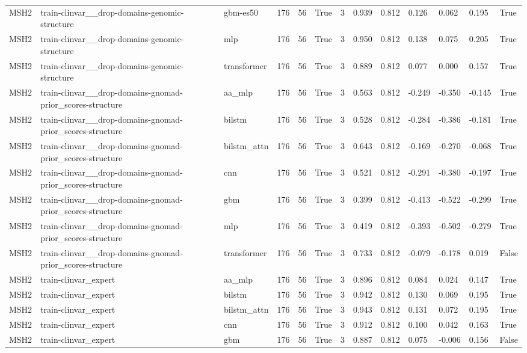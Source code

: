 \begin{table}[t]
\begin{tabular}{lllllllllllll}
MSH2 & train-clinvar\_\_drop-domains-genomic-structure & gbm-es50 & 176 & 56 & True & 3 & 0.939 & 0.812 & 0.126 & 0.062 & 0.195 & True \\
MSH2 & train-clinvar\_\_drop-domains-genomic-structure & mlp & 176 & 56 & True & 3 & 0.950 & 0.812 & 0.138 & 0.075 & 0.205 & True \\
MSH2 & train-clinvar\_\_drop-domains-genomic-structure & transformer & 176 & 56 & True & 3 & 0.889 & 0.812 & 0.077 & 0.000 & 0.157 & True \\
MSH2 & train-clinvar\_\_drop-domains-gnomad-prior\_scores-structure & aa\_mlp & 176 & 56 & True & 3 & 0.563 & 0.812 & -0.249 & -0.350 & -0.145 & True \\
MSH2 & train-clinvar\_\_drop-domains-gnomad-prior\_scores-structure & bilstm & 176 & 56 & True & 3 & 0.528 & 0.812 & -0.284 & -0.386 & -0.181 & True \\
MSH2 & train-clinvar\_\_drop-domains-gnomad-prior\_scores-structure & bilstm\_attn & 176 & 56 & True & 3 & 0.643 & 0.812 & -0.169 & -0.270 & -0.068 & True \\
MSH2 & train-clinvar\_\_drop-domains-gnomad-prior\_scores-structure & cnn & 176 & 56 & True & 3 & 0.521 & 0.812 & -0.291 & -0.380 & -0.197 & True \\
MSH2 & train-clinvar\_\_drop-domains-gnomad-prior\_scores-structure & gbm & 176 & 56 & True & 3 & 0.399 & 0.812 & -0.413 & -0.522 & -0.299 & True \\
MSH2 & train-clinvar\_\_drop-domains-gnomad-prior\_scores-structure & mlp & 176 & 56 & True & 3 & 0.419 & 0.812 & -0.393 & -0.502 & -0.279 & True \\
MSH2 & train-clinvar\_\_drop-domains-gnomad-prior\_scores-structure & transformer & 176 & 56 & True & 3 & 0.733 & 0.812 & -0.079 & -0.178 & 0.019 & False \\
MSH2 & train-clinvar\_expert & aa\_mlp & 176 & 56 & True & 3 & 0.896 & 0.812 & 0.084 & 0.024 & 0.147 & True \\
MSH2 & train-clinvar\_expert & bilstm & 176 & 56 & True & 3 & 0.942 & 0.812 & 0.130 & 0.069 & 0.195 & True \\
MSH2 & train-clinvar\_expert & bilstm\_attn & 176 & 56 & True & 3 & 0.943 & 0.812 & 0.131 & 0.072 & 0.195 & True \\
MSH2 & train-clinvar\_expert & cnn & 176 & 56 & True & 3 & 0.912 & 0.812 & 0.100 & 0.042 & 0.163 & True \\
MSH2 & train-clinvar\_expert & gbm & 176 & 56 & True & 3 & 0.887 & 0.812 & 0.075 & -0.006 & 0.156 & False \\

\end{tabular}
\end{table}
